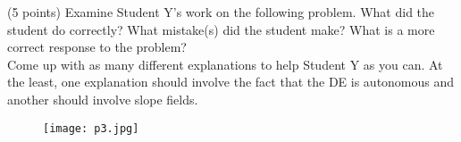 \documentclass[11pt,letterpaper,boxed]{hmcpset}
\begin{document}

\begin{problem}[4]
(5 points) Examine Student Y’s work on the following problem. What did the student do correctly? What mistake(s) did the student make? What is a more correct response to the problem?\\
Come up with as many different explanations to help Student Y as you can. At the least, one explanation should involve the fact that the DE is autonomous and another should involve slope fields.
\end{problem}
\begin{figure}[ht!]
\centering
\texttt{[image: p3.jpg]}
\end{figure}


\pagebreak

\end{document}
